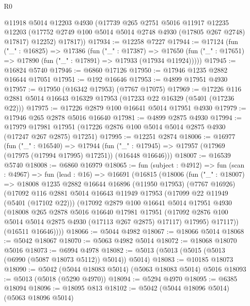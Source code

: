 \begin{lexlean}{R0}
\begin{coremodule}
        @11918
        @5014
        @12203
        @4930
        (@17739
          @265
          @2751
          @5016
          @11917
          @12235
          @12203
          (@17752 @2749 @100 @5014 @5014 @2748 @4930 (@17805 @267 @2748) @17817)
          @12252)
        @17817))
@17934 := @12258 @7227
@17944 := @17124
    (fun ("_" : @16825) =>
    @17386
      (fun ("_" : @17387) =>
      @17650 (fun ("_" : @17651) => @17890 (fun ("_" : @17891) => @17933 (@17934 @11924)))))
@17945 := @16824 @5740
@17946 := @6860 @17126
@17950 := @17946 @1235 @2882 @16644 @17051
@17951 := @192 @16646
@17953 := @4899 @17951 @4930
@17957 := @17950 (@16342 @17953) (@7767 @17075)
@17969 := @17226 @116 @2881 @5014 @16643 @16329 @17953 (@17233 @22 @16329 (@5401 (@17236 @22)))
@17975 := @17226 @2879 @100 @16641 @5014 @17951 @4930
@17979 := @17946 @265 @2878 @5016 @16640
@17981 := @4899 @2875 @4930
@17994 := @17979
    @17981
    @17951
    (@17226 @2876 @100 @5014 @5014 @2875 @4930 (@17247 @267 @2875) @17251)
@17995 := @12251 @2874
@18006 := @16977
    (fun ("_" : @16540) =>
    @17944 (fun ("_" : @17945) => @17957 (@17969 (@17975 (@17994 @17995) @17251)) (@16448 @16646)))
@18007 := @16539 @5740
@18008 := @6860 @16979
@18065 := fun (subject : @4912) =>
  fun (scan : @4967) =>
  fun (lead : @16) =>
  @16691
    (@16815
      (@18006
        (fun ("_" : @18007) =>
        @18008
          @1235
          @2882
          @16644
          @16896
          (@11950 @17953)
          (@7767 @16926)
          (@17092
            @116
            @2881
            @5014
            @16643
            @11949
            @17953
            (@17099 @22 @11949 (@5401 (@17102 @22)))
            (@17092
              @2879
              @100
              @16641
              @5014
              @17951
              @4930
              (@18008
                @265
                @2878
                @5016
                @16640
                @17981
                @17951
                (@17092 @2876 @100 @5014 @5014 @2875 @4930 (@17113 @267 @2875) @17117)
                @17995)
              @17117))
          (@16511 @16646))))
@18066 := @5044 @4982
@18067 := @18066 @5014
@18068 := @5042 @18067
@18070 := @5063 @4982 @5014
@18072 := @18068 @18070 @5016
@18073 := @6994 @4978
@18082 := @5013 (@5013 (@5015 (@5013 (@6990 (@5087 @18073 @5112)) @5014)) @5014)
@18083 := @10185 @18073
@18090 := @5042 (@5044 @18083 @5014) (@5063 @18083 @5014) @5016
@18093 := @5013 (@5018 (@5290 @4970))
@18094 := @5294 @4970
@18095 := @6385 @18094
@18096 := @18095 @813
@18102 := @5042 (@5044 @18096 @5014) (@5063 @18096 @5014)

\end{coremodule}
\end{lexlean}
